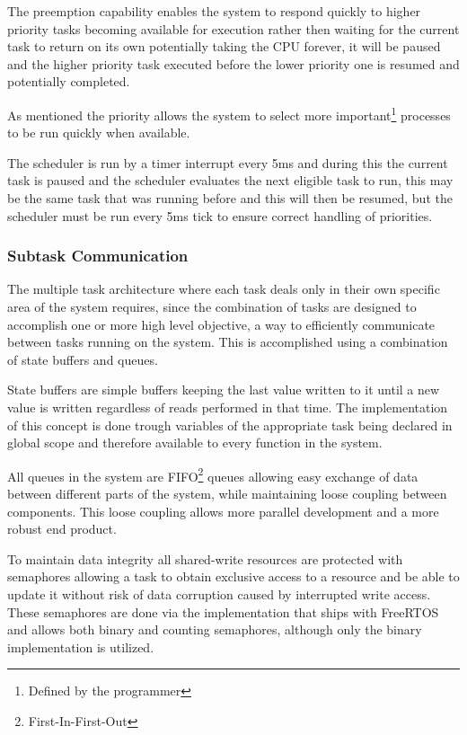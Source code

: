 \documentclass[../../../main]{subfiles}
\begin{document}
The preemption capability enables the system to respond quickly to higher priority tasks becoming available for execution rather then waiting for the current task to return on its own potentially taking the CPU forever, it will be paused and the higher priority task executed before the lower priority one is resumed and potentially completed.
 
As mentioned the priority allows the system to select more important\footnote{Defined by the programmer} processes to be run quickly when available.  

The scheduler is run by a timer interrupt every 5ms and during this the current task is paused and the scheduler evaluates the next eligible task to run, this may be the same task that was running before and this will then be resumed, but the scheduler must be run every 5ms tick to ensure correct handling of priorities.

\subsubsection{Subtask Communication}

The multiple task architecture where each task deals only in their own specific area of the system requires, since the combination of tasks are designed to accomplish one or more high level objective, a way to efficiently communicate between tasks running on the system. 
This is accomplished using a combination of state buffers and queues. 

State buffers are simple buffers keeping the last value written to it until a new value is written regardless of reads performed in that time. The implementation of this concept is done trough variables of the appropriate task being declared in global scope and therefore available to every function in the system.

All queues in the system are FIFO\footnote{First-In-First-Out} queues allowing easy exchange of data between different parts of the system, while maintaining loose coupling between components. This loose coupling allows more parallel development and a more robust end product. 

To maintain data integrity all shared-write resources are protected with semaphores allowing a task to obtain exclusive access to a resource and be able to update it without risk of data corruption caused by interrupted write access.
These semaphores are done via the implementation that ships with FreeRTOS and allows both binary and counting semaphores, although only the binary implementation is utilized.
\end{document}
